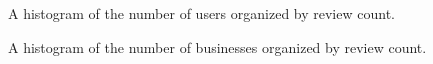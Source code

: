 \documentclass[10pt,twocolumn,letterpaper]{article}
\begin{document}
\begin{figure}[t]
\begin{center}
\end{center}
   \caption{A histogram of the number of users organized by review count.}
\label{fig:usrCnt}
\end{figure}

\begin{figure}[t]
\begin{center}
\end{center}
   \caption{A histogram of the number of businesses organized by review count.}
\label{fig:bizCnt}
\end{figure}
\end{document}
